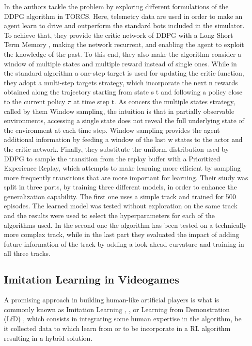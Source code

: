 In \cite{formularl} the authors tackle the problem by exploring different formulations of the DDPG algorithm in TORCS.
Here, telemetry data are used in order to make an agent learn to drive and outperform the standard bots included in the simulator.
To achieve that, they provide the critic network of DDPG with a Long Short Term Memory \cite{lstm}, making the network recurrent, and enabling the agent to exploit the knowledge of the past. To this end, they also make the algorithm consider a window of multiple states and multiple reward instead of single ones.
While in the standard algorithm a one-step target is used for updating the critic function, they adopt a multi-step targets strategy, which incorporate the next n rewards obtained along the trajectory starting from state s t and following a policy close to the current policy \(\pi\) at time step t.
As concers the multiple states strategy, called by them Window sampling, the intuition is that in partially observable environments, accessing a single state does not reveal the full underlying state of the environment at each time step. Window sampling provides the agent additional information by feeding a window of the last w states to the actor and the critic network.
Finally, they substitute the uniform distribution used by DDPG to sample the transition from the replay buffer with a Prioritized Experience Replay, which attempts to make learning more efficient by sampling more frequently transitions that are more important for learning.
Their study was split in three parts, by training three different models, in order to enhance the generalization capability. The first one uses a simple track and trained for 500 episodes. The learned model was tested without exploration on the same track and the results were used to select the hyperparameters for each of the algorithms used. In the second one the algorithm has been tested on a technically more complex track, while in the last part they evaluated the impact of adding future information of the track by adding a look ahead curvature and training in all three tracks.


\subsection{Imitation Learning in Videogames}

A promising approach in building human-like artificial players is what is commonly known as Imitation Learning \cite{imit1}, \cite{imit2}, or Learning from Demonstration (LfD) \cite{lfd}, which consists in integrating some human expertise in the algorithm, be it collected data to which learn from or to be incorporate in a RL algorithm resulting in a hybrid solution.


